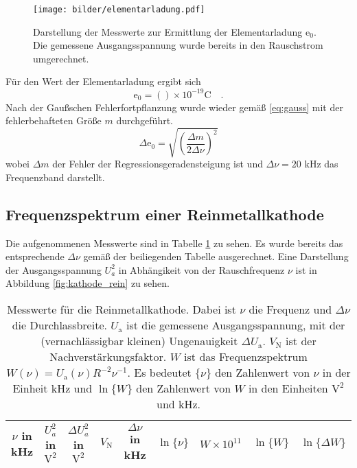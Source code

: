 	\begin{figure}
		\centering
		\texttt{[image: bilder/elementarladung.pdf]}
		\caption{Darstellung der Messwerte zur Ermittlung der
		Elementarladung $\text{e}_0$. Die gemessene Ausgangsspannung
		wurde bereits in den Rauschstrom umgerechnet.}
		\label{fig:elementarladung}
	\end{figure}

	Für den Wert der Elementarladung ergibt sich
	\begin{equation}
	\text{e}_0 = () \times
				10^{-19}\text{C} \quad .
	\end{equation}
	Nach der Gaußschen Fehlerfortpflanzung wurde wieder gemäß \eqref{eq:gauss} mit der
	fehlerbehafteten Größe $m$ durchgeführt.
	\begin{equation}
	\Delta \text{e}_0 = \sqrt{\left( \frac{\Delta m}{2 \Delta \nu} \right)^2}
	\end{equation}
	wobei $\Delta m$ der Fehler der Regressionsgeradensteigung ist und
	$\Delta \nu=20\text{ kHz}$ das Frequenzband darstellt.

\clearpage
\subsection{Frequenzspektrum einer Reinmetallkathode}

	Die aufgenommenen Messwerte sind in Tabelle
	\ref{tab:kathode_rein} zu sehen. Es wurde bereits das
	entsprechende $\Delta \nu$ gemäß der beiliegenden Tabelle
	ausgerechnet. Eine Darstellung der Ausgangsspannung $U_a^2$ in
	Abhängikeit von der Rauschfrequenz $\nu$ ist in Abbildung
	\ref{fig:kathode_rein} zu sehen.
	\begin{table}[h]
		\centering
		\begin{tabular}{ccccccccc}
		\toprule \midrule
		$\nu$ in kHz	 & $U_a^2$ in $\text{V}^2$	& $\Delta U_a^2$ in $\text{V}^2$ &
		$V_\text{N}$	 & $\Delta \nu$ in kHz 		& $\ln \{\nu\}$				     &
		$W\times 10^{11}$&$\ln \{W\}$	 & $\ln \{\Delta W\} $ \\
		\midrule
		
		\midrule
		\bottomrule
		\end{tabular}
		\caption{Messwerte für
		die Reinmetallkathode. Dabei ist $\nu$ die Frequenz und $\Delta \nu$ die
		Durchlassbreite. $U_\text{a}$ ist die gemessene Ausgangsspannung, mit der
		(vernachlässigbar kleinen) Ungenauigkeit $\Delta U_\text{a}$. $V_\text{N}$
		ist der Nachverstärkungsfaktor. $W$ ist das Frequenzspektrum
		$W(\nu)=U_\text{a}(\nu) R^{-2} \nu^{-1}$. Es bedeutet $\{\nu \}$ den
		Zahlenwert von $\nu$ in der Einheit kHz und $\ln\{W\}$ den Zahlenwert
		von $W$ in den Einheiten $\text{V}^2$ und kHz.}
		\label{tab:kathode_rein}
	\end{table}

